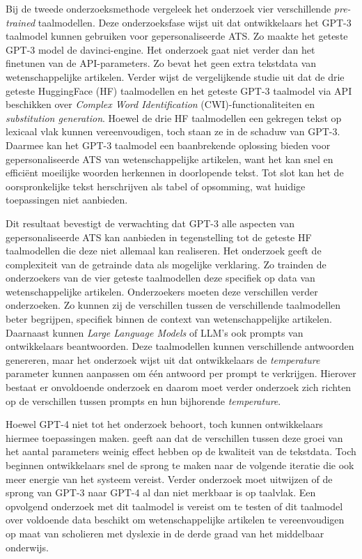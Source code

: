 \medspace

Bij de tweede onderzoeksmethode vergeleek het onderzoek vier verschillende \textit{pre-trained} taalmodellen. Deze onderzoeksfase wijst uit dat ontwikkelaars het GPT-3 taalmodel kunnen gebruiken voor gepersonaliseerde ATS. Zo maakte het geteste GPT-3 model de davinci-engine. Het onderzoek gaat niet verder dan het finetunen van de API-parameters. Zo bevat het geen extra tekstdata van wetenschappelijke artikelen. Verder wijst de vergelijkende studie uit dat de drie geteste HuggingFace (HF) taalmodellen en het geteste GPT-3 taalmodel via API beschikken over \textit{Complex Word Identification} (CWI)-functionaliteiten en \textit{substitution generation}. Hoewel de drie HF taalmodellen een gekregen tekst op lexicaal vlak kunnen vereenvoudigen, toch staan ze in de schaduw van GPT-3. Daarmee kan het GPT-3 taalmodel een baanbrekende oplossing bieden voor gepersonaliseerde ATS van wetenschappelijke artikelen, want het kan snel en efficiënt moeilijke woorden herkennen in doorlopende tekst. Tot slot kan het de oorspronkelijke tekst herschrijven als tabel of opsomming, wat huidige toepassingen niet aanbieden.

\medspace

Dit resultaat bevestigt de verwachting dat GPT-3 alle aspecten van gepersonaliseerde ATS kan aanbieden in tegenstelling tot de geteste HF taalmodellen die deze niet allemaal kan realiseren. Het onderzoek geeft de complexiteit van de getrainde data als mogelijke verklaring. Zo trainden de onderzoekers van de vier geteste taalmodellen deze specifiek op data van wetenschappelijke artikelen. Onderzoekers moeten deze verschillen verder onderzoeken. Zo kunnen zij de verschillen tussen de verschillende taalmodellen beter begrijpen, specifiek binnen de context van wetenschappelijke artikelen. Daarnaast kunnen \textit{Large Language Models} of LLM's ook prompts van ontwikkelaars beantwoorden. Deze taalmodellen kunnen verschillende antwoorden genereren, maar het onderzoek wijst uit dat ontwikkelaars de \textit{temperature} parameter kunnen aanpassen om één antwoord per prompt te verkrijgen. Hierover bestaat er onvoldoende onderzoek en daarom moet verder onderzoek zich richten op de verschillen tussen prompts en hun bijhorende \textit{temperature}. 

\medspace

Hoewel GPT-4 niet tot het onderzoek behoort, toch kunnen ontwikkelaars hiermee toepassingen maken. \textcite{Simon2021} geeft aan dat de verschillen tussen deze groei van het aantal parameters weinig effect hebben op de kwaliteit van de tekstdata. Toch beginnen ontwikkelaars snel de sprong te maken naar de volgende iteratie die ook meer energie van het systeem vereist. Verder onderzoek moet uitwijzen of de sprong van GPT-3 naar GPT-4 al dan niet merkbaar is op taalvlak. Een opvolgend onderzoek met dit taalmodel is vereist om te testen of dit taalmodel over voldoende data beschikt om wetenschappelijke artikelen te vereenvoudigen op maat van scholieren met dyslexie in de derde graad van het middelbaar onderwijs. 

